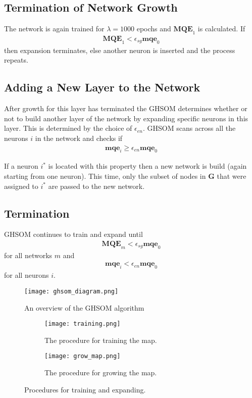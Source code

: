 \documentclass{report}
\begin{document}
\subsection{Termination of Network Growth}
The network is again trained for $\lambda=1000$ epochs and $\textbf{MQE}_1$ is calculated. If
\begin{align*}
\textbf{MQE}_1 < \epsilon_{sg} \textbf{mqe}_0
\end{align*}
then expansion terminates, else another neuron is inserted and the process repeats.

\subsection{Adding a New Layer to the Network}
After growth for this layer has terminated the GHSOM determines whether or not to build another layer of the network by expanding specific neurons in this layer. This is determined by the choice of $\epsilon_{en}$. GHSOM scans across all the neurons $i$ in the network and checks if
\begin{align*}
\textbf{mqe}_i \geq \epsilon_{en} \textbf{mqe}_0
\end{align*}

If a neuron $i^*$ is located with this property then a new network is build (again starting from one neuron). This time, only the subset of nodes in $\textbf{G}$ that were assigned to $i^*$ are passed to the new network.

\subsection{Termination}
GHSOM continues to train and expand until 
\begin{align*}
\textbf{MQE}_m < \epsilon_{sg} \textbf{mqe}_0
\end{align*}
for all networks $m$ and
\begin{align*}
\textbf{mqe}_i < \epsilon_{en} \textbf{mqe}_0
\end{align*}
for all neurons $i$. 

\begin{figure}
\centering
\texttt{[image: ghsom\_diagram.png]}
\caption{An overview of the GHSOM algorithm}
\label{ghsom_diagram}
\end{figure}

\begin{figure}
	\centering
	\begin{subfigure}{0.45\textwidth}
		\centering
		\texttt{[image: training.png]}
		\caption{The procedure for training the map.}
		\label{train_map}
	\end{subfigure}%
	\begin{subfigure}{0.45\textwidth}
		\centering
		\texttt{[image: grow\_map.png]}
		\caption{The procedure for growing the map.}
		\label{grow_map}
	\end{subfigure}
	\caption{Procedures for training and expanding.}
\end{figure}
\end{document}
